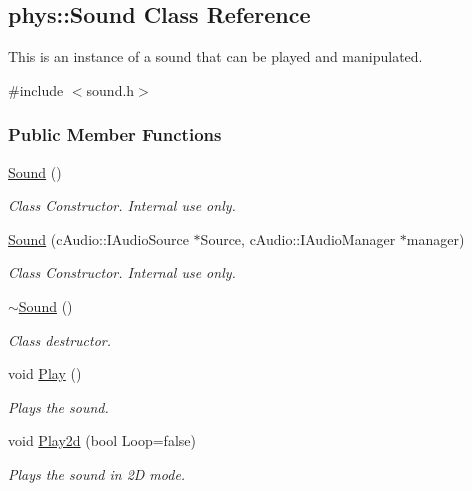 \hypertarget{classphys_1_1Sound}{
\subsection{phys::Sound Class Reference}
\label{classphys_1_1Sound}
}


This is an instance of a sound that can be played and manipulated.  




{\ttfamily \#include $<$sound.h$>$}

\subsubsection*{Public Member Functions}
\begin{DoxyCompactItemize}
\item 
\hyperlink{classphys_1_1Sound_a6a9d4b475da9453c9b02ca2c49a6fa76}{Sound} ()
\begin{DoxyCompactList}\small\item\em Class Constructor. Internal use only. \item\end{DoxyCompactList}\item 
\hyperlink{classphys_1_1Sound_a0452d6079bcb201f9d2f3b2742eb21b6}{Sound} (cAudio::IAudioSource $\ast$Source, cAudio::IAudioManager $\ast$manager)
\begin{DoxyCompactList}\small\item\em Class Constructor. Internal use only. \item\end{DoxyCompactList}\item 
\hyperlink{classphys_1_1Sound_ad49df56479e003d0990a5dcb1c506d39}{$\sim$Sound} ()
\begin{DoxyCompactList}\small\item\em Class destructor. \item\end{DoxyCompactList}\item 
void \hyperlink{classphys_1_1Sound_ae7caa90deb9e5a4cab2d5ada27f5e5b5}{Play} ()
\begin{DoxyCompactList}\small\item\em Plays the sound. \item\end{DoxyCompactList}\item 
void \hyperlink{classphys_1_1Sound_a853bb9a2c1b41cd82a385608614861e7}{Play2d} (bool Loop=false)
\begin{DoxyCompactList}\small\item\em Plays the sound in 2D mode. \item\end{DoxyCompactList}\item 

\end{DoxyCompactItemize}
